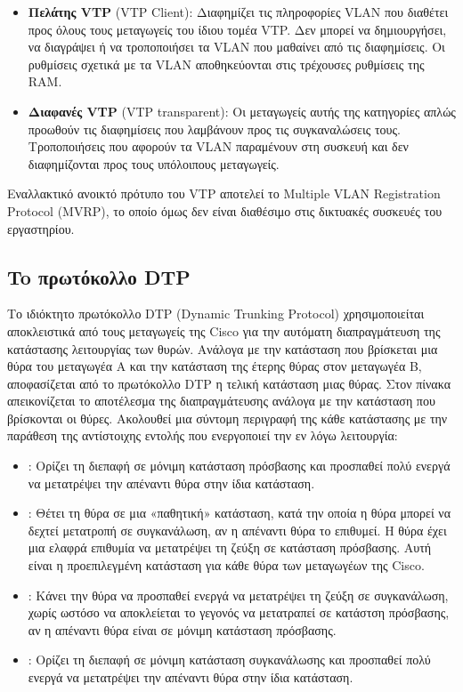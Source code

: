 \documentclass{EdipyLabs} %
\begin{document}
\begin{itemize}
\begin{itemize}
		\item \textbf{Πελάτης VTP} (VTP Client): Διαφημίζει τις πληροφορίες VLAN που διαθέτει προς όλους τους μεταγωγείς του ίδιου τομέα VTP. Δεν μπορεί να δημιουργήσει, να διαγράψει ή να τροποποιήσει τα VLAN που μαθαίνει από τις διαφημίσεις. Οι ρυθμίσεις σχετικά με τα VLAN αποθηκεύονται στις τρέχουσες ρυθμίσεις της RAM. 
		\item \textbf{Διαφανές VTP} (VTP transparent): Οι μεταγωγείς αυτής της κατηγορίες απλώς προωθούν τις διαφημίσεις που λαμβάνουν προς τις συγκαναλώσεις τους. Τροποποιήσεις που αφορούν τα VLAN παραμένουν στη συσκευή και δεν διαφημίζονται προς τους υπόλοιπους μεταγωγείς.
	\end{itemize}
\end{itemize}
Εναλλακτικό ανοικτό πρότυπο του VTP αποτελεί το Multiple VLAN Registration Protocol (MVRP), το οποίο όμως δεν είναι διαθέσιμο στις δικτυακές συσκευές του εργαστηρίου. 

\subsection{To πρωτόκολλο DTP}

Το ιδιόκτητο πρωτόκολλο DTP (Dynamic Trunking Protocol) χρησιμοποιείται αποκλειστικά από τους μεταγωγείς της Cisco για την αυτόματη διαπραγμάτευση της κατάστασης λειτουργίας των θυρών. Ανάλογα με την κατάσταση που βρίσκεται μια θύρα του μεταγωγέα Α και την κατάσταση της έτερης θύρας στον μεταγωγέα Β, αποφασίζεται από το πρωτόκολλο DTP η τελική κατάσταση μιας θύρας. Στον πίνακα απεικονίζεται το αποτέλεσμα της διαπραγμάτευσης ανάλογα με την κατάσταση που βρίσκονται οι θύρες. Ακολουθεί μια σύντομη περιγραφή της κάθε κατάστασης με την παράθεση της αντίστοιχης εντολής που ενεργοποιεί την εν λόγω λειτουργία:
\begin{itemize}
	\item {}: Ορίζει τη διεπαφή σε μόνιμη κατάσταση πρόσβασης και προσπαθεί πολύ ενεργά να μετατρέψει την απέναντι θύρα στην ίδια κατάσταση.
	\item {}: Θέτει τη θύρα σε μια «παθητική» κατάσταση, κατά την οποία η θύρα μπορεί να δεχτεί μετατροπή σε συγκανάλωση, αν η απέναντι θύρα το επιθυμεί. Η θύρα έχει μια ελαφρά επιθυμία να μετατρέψει τη ζεύξη σε κατάσταση πρόσβασης. Αυτή είναι η προεπιλεγμένη κατάσταση για κάθε θύρα των μεταγωγέων της Cisco. 
	\item {}: Κάνει την θύρα να προσπαθεί ενεργά να μετατρέψει τη ζεύξη σε συγκανάλωση, χωρίς ωστόσο να αποκλείεται το γεγονός να μετατραπεί σε κατάστση πρόσβασης, αν η απέναντι θύρα είναι σε μόνιμη κατάσταση πρόσβασης.
	\item {}: Ορίζει τη διεπαφή σε μόνιμη κατάσταση συγκανάλωσης και προσπαθεί πολύ ενεργά να μετατρέψει την απέναντι θύρα στην ίδια κατάσταση.
\end{itemize}
\end{document}
